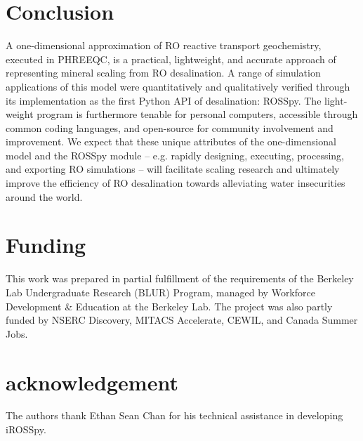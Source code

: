 \section{Conclusion}

A one-dimensional approximation of RO reactive transport geochemistry, executed in PHREEQC, is a practical, lightweight, and accurate approach of representing mineral scaling from RO desalination. A range of simulation applications of this model were quantitatively and qualitatively verified through its implementation as the first Python API of desalination: ROSSpy. The light-weight program is furthermore tenable for personal computers, accessible through common coding languages, and open-source for community involvement and improvement. We expect that these unique attributes of the one-dimensional model and the ROSSpy module -- e.g. rapidly designing, executing, processing, and exporting RO simulations -- will facilitate scaling research and ultimately improve the efficiency of RO desalination towards alleviating water insecurities around the world. 

\section{Funding}
This work was prepared in partial fulfillment of the requirements of the Berkeley Lab Undergraduate Research (BLUR) Program, managed by Workforce Development \& Education at the Berkeley Lab. The project was also partly funded by NSERC Discovery, MITACS Accelerate, CEWIL, and Canada Summer Jobs. 

\section{acknowledgement}
The authors thank Ethan Sean Chan for his technical assistance in developing iROSSpy. 